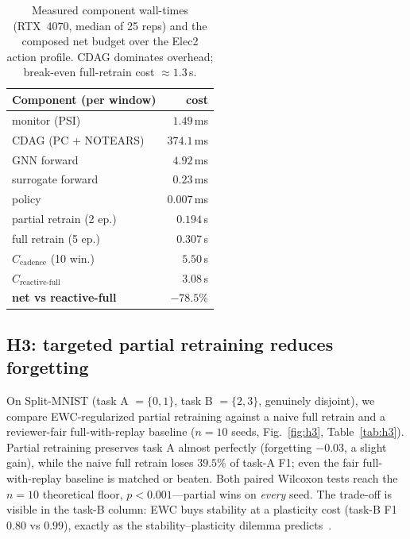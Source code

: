 \documentclass[conference]{IEEEtran}
\begin{document}
\begin{table}[t]
\centering
\caption{Measured component wall-times (RTX~4070, median of 25 reps) and the
composed net budget over the Elec2 action profile. CDAG dominates overhead;
break-even full-retrain cost $\approx1.3$\,s.}
\label{tab:overhead}
\setlength{\tabcolsep}{5pt}
\begin{tabular}{@{}lr@{}}
\toprule
\textbf{Component (per window)} & \textbf{cost}\\
\midrule
monitor (PSI)              & $1.49$\,ms\\
CDAG (PC + NOTEARS)        & $\mathbf{374.1}$\,ms\\
GNN forward               & $4.92$\,ms\\
surrogate forward         & $0.23$\,ms\\
policy                    & $0.007$\,ms\\
\midrule
partial retrain (2 ep.)   & $0.194$\,s\\
full retrain (5 ep.)      & $0.307$\,s\\
\midrule
$C_{\text{cadence}}$ (10 win.) & $5.50$\,s\\
$C_{\text{reactive-full}}$     & $3.08$\,s\\
\textbf{net vs reactive-full} & $\mathbf{-78.5\%}$\\
\bottomrule
\end{tabular}
\end{table}

\subsection{H3: targeted partial retraining reduces forgetting}\label{sec:h3}
On Split-MNIST (task A $=\{0,1\}$, task B $=\{2,3\}$, genuinely disjoint),
we compare EWC-regularized partial retraining against a naive full retrain
and a reviewer-fair full-with-replay baseline ($n{=}10$ seeds,
Fig.~\ref{fig:h3}, Table~\ref{tab:h3}). Partial retraining preserves task
A almost perfectly (forgetting $-0.03$, a slight gain), while the naive
full retrain loses $39.5\%$ of task-A F1; even the fair full-with-replay
baseline is matched or beaten. Both paired Wilcoxon tests reach the
$n{=}10$ theoretical floor, $p<0.001$---partial wins on \emph{every} seed.
The trade-off is visible in the task-B column: EWC buys stability at a
plasticity cost (task-B F1 $0.80$ vs $0.99$), exactly as the
stability--plasticity dilemma
predicts~\cite{mccloskey1989catastrophic,french1999catastrophic,delange2021continual}.
\end{document}
